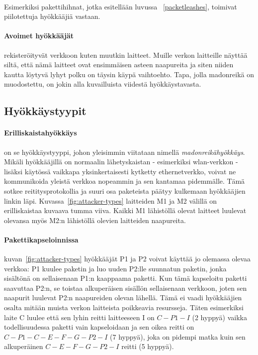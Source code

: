 \documentclass[finnish]{tktltiki2}
\theoremstyle{definition}
\theoremstyle{remark}
\begin{document}
\noindent \\
Esimerkiksi pakettihihnat, jotka esitellään luvussa ~\ref{packetleashes}, toimivat piilotettuja hyökkääjiä vastaan.

\paragraph{Avoimet hyökkääjät} rekisteröityvät verkkoon kuten muutkin laitteet. Muille verkon laitteille näyttää siltä, että nämä laitteet ovat ensimmäisen asteen naapureita ja siten niiden kautta löytyvä lyhyt polku on täysin käypä vaihtoehto. Tapa, jolla madonreikä on muodostettu, on jokin alla kuvailluista viidestä hyökkäystavasta.

\subsection{Hyökkäystyypit}

\paragraph{Erilliskaistahyökkäys} on se hyökkäystyyppi, johon yleisimmin viitataan nimellä \emph{madonreikähyökkäys}. Mikäli hyökkääjillä on normaalin lähetyskaistan - esimerkiksi wlan-verkkon - lisäksi käytössä vaikkapa yksinkertaisesti kytketty ethernetverkko, voivat ne kommunikoida yleistä verkkoa nopeammin ja sen kantamaa pidemmälle. Tämä sotkee reititysprotokollia ja suuri osa paketeista päätyy kulkemaan hyökkääjien linkin läpi. Kuvassa~\ref{fig:attacker-types} laitteiden M1 ja M2 välillä on erilliskaistaa kuvaava tumma viiva. Kaikki M1 lähistöllä olevat laitteet luulevat olevansa myös M2:n lähistöllä olevien laitteiden naapureita.

\paragraph{Pakettikapseloinnissa} kuvan~\ref{fig:attacker-types} hyökkääjät P1 ja P2 voivat käyttää jo olemassa olevaa verkkoa: P1 kuulee paketin ja luo uuden P2:lle suunnatun paketin, jonka sisältönä on sellaisenaan P1:n kaappaama paketti. Kun tämä kapseloitu paketti saavuttaa P2:n, se toistaa alkuperäisen sisällön sellaisenaan verkkoon, joten sen naapurit luulevat P2:n naapureiden olevan lähellä. Tämä ei vaadi hyökkääjien osalta mitään muista verkon laitteista poikkeavia resursseja. Täten esimerkiksi laite C luulee että sen lyhin reitti laitteeseen I on $C-P1-I$ (2 hyppyä) vaikka todellisuudessa paketti vain kapseloidaan ja sen oikea reitti on $C-P1-C-E-F-G-P2-I$ (7 hyppyä), joka on pidempi matka kuin sen alkuperäinen $C-E-F-G-P2-I$ reitti (5 hyppyä).
\end{document}
